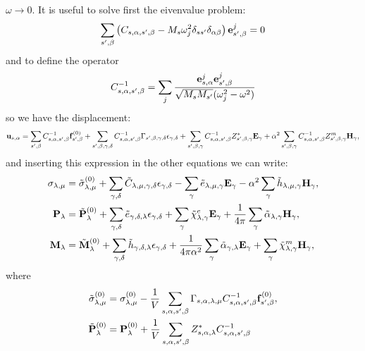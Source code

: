 \documentclass[12pt,a4paper]{article}
\begin{document}
{$\omega \rightarrow 0$.
It is useful to solve first the eivenvalue problem:
\begin{equation}
\sum_{s',\beta} \left(C_{s,\alpha,s',\beta} - 
M_s \omega_j^2 \delta_{ss'}\delta_{\alpha\beta}\right){\bf e}^j_{s',\beta}=0
\end{equation}
and to define the operator
\begin{equation}
C^{-1}_{s,\alpha,s',\beta} = \sum_j {{\bf e}^j_{s,\alpha} {\bf e}^j_{s',\beta}
\over \sqrt{M_s M_{s'}}(\omega^2_j - \omega^2)}
\end{equation}
so we have the displacement:
\begin{equation}
{\bf u}_{s,\alpha}=\sum_{s',\beta} C^{-1}_{s,\alpha,s',\beta}
{\bf f}^{(0)}_{s',\beta} + \sum_{s',\beta,\gamma,\delta} 
C^{-1}_{s,\alpha,s',\beta}
\Gamma_{s',\beta,\gamma,\delta} \epsilon_{\gamma,\delta}
+ \sum_{s',\beta,\gamma} C^{-1}_{s,\alpha,s',\beta}
Z^*_{s',\beta,\gamma} {\bf E}_{\gamma} 
+ \alpha^2 \sum_{s',\beta,\gamma} C^{-1}_{s,\alpha,s',\beta} 
Z^m_{s',\beta,\gamma} 
{\bf H}_{\gamma},
\end{equation}
and inserting this expression in the other equations we can write:
\begin{align}
\sigma_{\lambda,\mu}&= \tilde \sigma_{\lambda,\mu}^{(0)}
+\sum_{\gamma,\delta} \tilde C_{\lambda,\mu,\gamma,\delta}  
\epsilon_{\gamma,\delta} -
\sum_{\gamma} \tilde e_{\lambda,\mu,\gamma} 
 {\bf E}_{\gamma}
-\alpha^2 \sum_{\gamma}  \tilde h_{\lambda,\mu,\gamma} 
{\bf H}_{\gamma}, \\
{\bf P}_{\lambda}&= \tilde {\bf P}^{(0)}_{\lambda}
+\sum_{\gamma,\delta} \tilde e_{\gamma,\delta,\lambda} 
\epsilon_{\gamma,\delta} +
\sum_{\gamma} 
\tilde \chi^e_{\lambda,\gamma}
{\bf E}_{\gamma} +
{1\over 4 \pi}\sum_{\gamma} \tilde \alpha_{\lambda,\gamma} 
{\bf H}_{\gamma}, \\
{\bf M}_{\lambda}&= \tilde {\bf M}^{(0)}_{\lambda}
+\sum_{\gamma,\delta}  \tilde h_{\gamma,\delta,\lambda} 
\epsilon_{\gamma,\delta} 
+{1\over 4 \pi \alpha^2} \sum_{\gamma} \tilde \alpha_{\gamma,\lambda} 
{\bf E}_{\gamma}
+\sum_{\gamma} 
\tilde \chi^m_{\lambda,\gamma}
{\bf H}_{\gamma},
\end{align}
where 
\begin{align}
\tilde \sigma^{(0)}_{\lambda,\mu}&= \sigma^{(0)}_{\lambda,\mu}
-{1\over V} \sum_{s,\alpha,s',\beta} \Gamma_{s,\alpha,\lambda,\mu}
C^{-1}_{s,\alpha,s',\beta} {\bf f}^{(0)}_{s',\beta}, \\
\tilde {\bf P}^{(0)}_\lambda&= {\bf P}^{(0)}_\lambda +{1\over V}
\sum_{s,\alpha,s',\beta} Z^*_{s,\alpha,\lambda} C^{-1}_{s,\alpha,s',\beta}

\end{align}}
\end{document}
